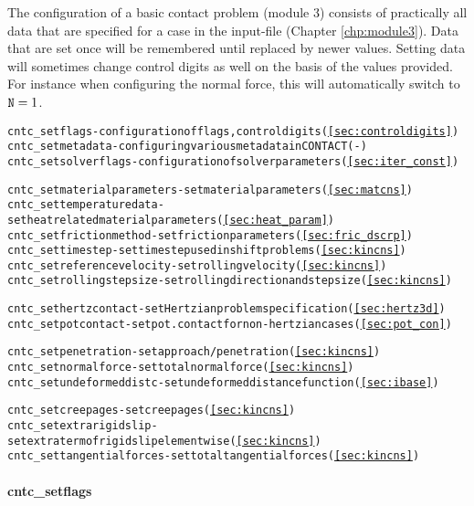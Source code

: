 \documentclass[12pt]{report}
\begin{document}
The configuration of a basic contact problem (module 3) consists of
practically all data that are specified for a case in the input-file (Chapter
\ref{chp:module3}). Data that are set once will be remembered until
replaced by newer values. Setting data will sometimes change control digits
as well on the basis of the values provided. For instance when configuring
the normal force, this will automatically switch to ${\tt N}=1$.
\begin{alltt}\small
cntc_setflags               - configuration of flags, control digits (\ref{sec:controldigits})
cntc_setmetadata            - configuring various metadata in CONTACT (-)
cntc_setsolverflags         - configuration of solver parameters (\ref{sec:iter_const})

cntc_setmaterialparameters  - set material parameters (\ref{sec:matcns})
cntc_settemperaturedata     - set heat related material parameters (\ref{sec:heat_param})
cntc_setfrictionmethod      - set friction parameters (\ref{sec:fric_dscrp})
cntc_settimestep            - set time step used in shift problems (\ref{sec:kincns})
cntc_setreferencevelocity   - set rolling velocity (\ref{sec:kincns})
cntc_setrollingstepsize     - set rolling direction and step size (\ref{sec:kincns})

cntc_sethertzcontact        - set Hertzian problem specification (\ref{sec:hertz3d})
cntc_setpotcontact          - set pot.contact for non-hertzian cases (\ref{sec:pot_con})

cntc_setpenetration         - set approach/penetration (\ref{sec:kincns})
cntc_setnormalforce         - set total normal force (\ref{sec:kincns})
cntc_setundeformeddistc     - set undeformed distance function (\ref{sec:ibase})

cntc_setcreepages           - set creepages (\ref{sec:kincns})
cntc_setextrarigidslip      - set extra term of rigid slip elementwise (\ref{sec:kincns})
cntc_settangentialforces    - set total tangential forces (\ref{sec:kincns})
\end{alltt}

\paragraph{cntc\_setflags}
\end{document}
